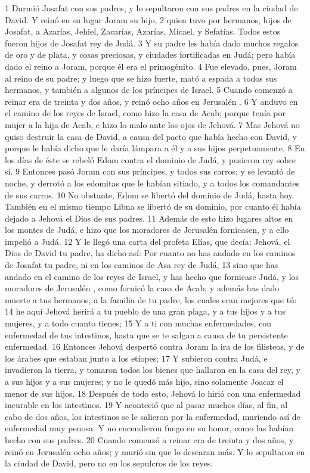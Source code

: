 1 Durmió Josafat con sus padres, y lo sepultaron con sus padres en la ciudad de David. Y reinó en su lugar Joram su hijo,
2 quien tuvo por hermanos, hijos de Josafat, a Azarías, Jehiel, Zacarías, Azarías, Micael, y Sefatías. Todos estos fueron hijos de Josafat rey de Judá.
3 Y su padre les había dado muchos regalos de oro y de plata, y cosas preciosas, y ciudades fortificadas en Judá; pero había dado el reino a Joram, porque él era el primogénito.
4  Fue  elevado, pues, Joram al reino de su padre; y luego que se hizo fuerte, mató a espada a todos sus hermanos, y también a algunos de los príncipes de Israel.
5 Cuando comenzó a reinar era de treinta y dos años, y reinó ocho años en Jerusalén .
6 Y anduvo en el camino de los reyes de Israel, como hizo la casa de Acab; porque tenía por mujer a la hija de Acab, e hizo lo malo ante los ojos de Jehová.
7 Mas Jehová no quiso destruir la casa de David, a causa del pacto que había hecho con David, y porque le había dicho que le daría lámpara a él y a sus hijos perpetuamente. 
8 En los días de éste se rebeló Edom contra el dominio de Judá, y pusieron rey sobre sí.
9 Entonces pasó Joram con sus príncipes, y todos sus carros; y se levantó de noche, y derrotó a los edomitas que le habían sitiado, y a todos los comandantes de sus carros.
10 No obstante, Edom se libertó del dominio de Judá, hasta hoy. También en el mismo tiempo Libna se libertó de su dominio, por cuanto él había dejado a Jehová el Dios de sus padres. 
11 Además de esto hizo lugares altos en los montes de Judá, e hizo que los moradores de Jerusalén  fornicasen, y a ello impelió a Judá.
12 Y le llegó una carta del profeta Elías, que decía: Jehová, el Dios de David tu padre, ha dicho así: Por cuanto no has andado en los caminos de Josafat tu padre, ni en los caminos de Asa rey de Judá,
13 sino que has andado en el camino de los reyes de Israel, y has hecho que fornicase Judá, y los moradores de Jerusalén , como fornicó la casa de Acab; y además has dado muerte a tus hermanos, a la familia de tu padre, los cuales eran mejores que tú:
14 he aquí Jehová herirá a tu pueblo de una gran plaga, y a tus hijos y a tus mujeres, y a todo cuanto tienes;
15 Y a ti con muchas enfermedades, con enfermedad de tus intestinos, hasta que se te salgan a causa de tu persistente enfermedad.
16 Entonces Jehová despertó contra Joram la ira de los filisteos, y de los árabes que estaban junto a los etíopes;
17 Y subieron contra Judá, e invadieron la tierra, y tomaron todos los bienes que hallaron en la casa del rey, y a sus hijos y a sus mujeres; y no le quedó más hijo, sino solamente Joacaz el menor de sus hijos.
18 Después de todo esto, Jehová lo hirió con una enfermedad incurable en los intestinos.
19 Y aconteció que al pasar muchos días, al fin, al cabo de dos años, los intestinos se le salieron por la enfermedad, muriendo así de enfermedad muy penosa. Y no encendieron fuego en su honor, como las habían hecho con sus padres.
20 Cuando comenzó a reinar era de treinta y dos años, y reinó en Jerusalén  ocho años; y murió sin que lo desearan más. Y lo sepultaron en la ciudad de David, pero no en los sepulcros de los reyes.

